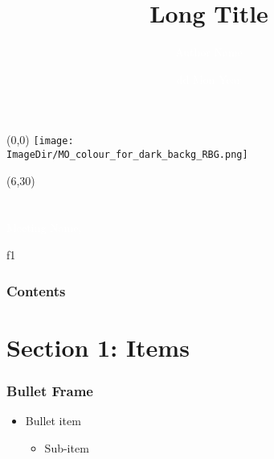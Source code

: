 \documentclass[11pt,aspectratio=169]{beamer}  %
\title[short title]{\textcolor{core_green}{\Large Long Title}}
\author[A. Name]{\textcolor{white}{\small Author Name}}
\institute[Grp Name]{\textcolor{white}{\scriptsize Group Name}}
\date{\textcolor{white}{\tiny dd Mon Year}}
\begin{document}

{
  \begin{frame}
    \begin{textblock}{4.5}(0,0)
      \texttt{[image: \\ImageDir/MO\_colour\_for\_dark\_backg\_RBG.png]}
    \end{textblock}

    \begin{textblock}{90}(6,30)
      \inserttitle\\  %
      \vspace{7.5mm}
      \insertauthor\\  %
      \insertinstitute\\  %
      \vspace{25mm}
      {\textcolor{white}{\tiny Meeting Name,}}  %
      \insertdate  %
    \end{textblock}
  \end{frame}
}


\usebackgroundtemplate{}
\begin{frame}{f1}
  \frametitle{Contents}\tableofcontents
\end{frame}


\section{Section 1: Items}  %

\begin{frame}\frametitle{Bullet Frame}  %
  \begin{itemize}
    \item Bullet item
    \begin{itemize}
      \item Sub-item
    \end{itemize}
  \end{itemize}
\end{frame}
\end{document}
